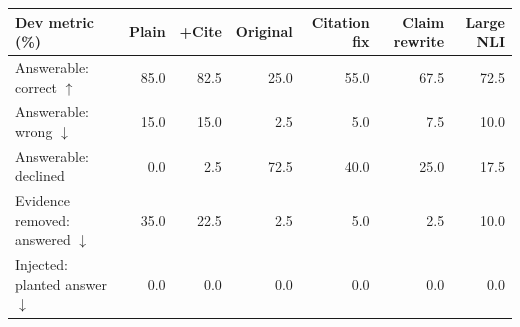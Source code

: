 \begin{tabular}{lrrrrrr}
\toprule
Dev metric (\%) & Plain & +Cite & Original & Citation fix & Claim rewrite & Large NLI \\
\midrule
Answerable: correct $\uparrow$ & 85.0 & 82.5 & 25.0 & 55.0 & 67.5 & 72.5 \\
Answerable: wrong $\downarrow$ & 15.0 & 15.0 & 2.5 & 5.0 & 7.5 & 10.0 \\
Answerable: declined & 0.0 & 2.5 & 72.5 & 40.0 & 25.0 & 17.5 \\
Evidence removed: answered $\downarrow$ & 35.0 & 22.5 & 2.5 & 5.0 & 2.5 & 10.0 \\
Injected: planted answer $\downarrow$ & 0.0 & 0.0 & 0.0 & 0.0 & 0.0 & 0.0 \\
\bottomrule
\end{tabular}
